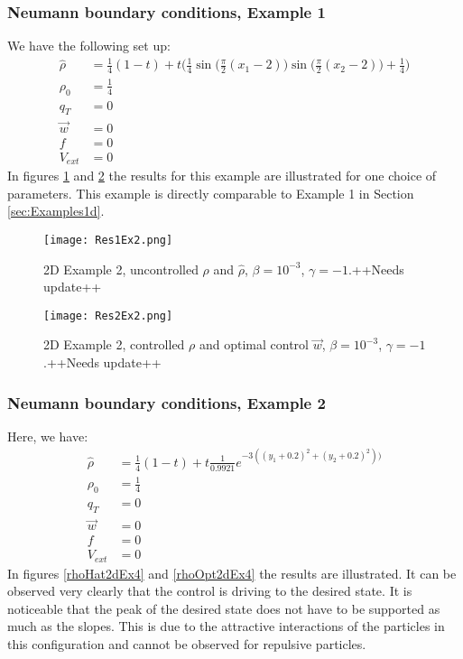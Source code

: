 \subsubsection{Neumann boundary conditions, Example 1}	
We have the following set up:
\begin{align*}
\widehat \rho &= \frac{1}{4}(1-t) + t\bigg(\frac{1}{4}\sin \bigg(\frac{\pi}{2}(x_1 - 2)\bigg)\sin \bigg(\frac{\pi}{2}(x_2 - 2)\bigg) + \frac{1}{4}\bigg)\\
\rho_0 &= \frac{1}{4}\\
q_{T} &= 0\\
\vec{w} &= 0\\
f &=0\\
V_{ext} &=0
\end{align*}
In figures \ref{rhoHat2dEx2} and \ref{rhoOpt2dEx2} the results for this example are illustrated for one choice of parameters. This example is directly comparable to Example 1 in Section \ref{sec:Examples1d}.
\begin{figure}[h]
	\texttt{[image: Res1Ex2.png]}
	\caption{2D Example 2, uncontrolled $\rho$ and $\widehat \rho$, $\beta = 10^{-3}$, $\gamma = -1$.++Needs update++}
	\label{rhoHat2dEx2}
\end{figure}
\begin{figure}[h]
	\texttt{[image: Res2Ex2.png]}
	\caption{2D Example 2, controlled $\rho$ and optimal control $\vec{w}$, $\beta = 10^{-3}$, $\gamma = -1$.++Needs update++}
	\label{rhoOpt2dEx2}
\end{figure}


\subsubsection{Neumann boundary conditions, Example 2}	
Here, we have:
\begin{align*}
\widehat \rho &= \frac{1}{4}(1-t) + t\frac{1}{0.9921}e^{-3((y_1+0.2)^2 + (y_2+0.2)^2))}\\
\rho_0 &= \frac{1}{4}\\
q_{T} &= 0\\
\vec{w} &= 0\\
f &=0\\
V_{ext} &=0
\end{align*}
In figures \ref{rhoHat2dEx4} and \ref{rhoOpt2dEx4} the results are illustrated. It can be observed very clearly that the control is driving to the desired state. It is noticeable that the peak of the desired state does not have to be supported as much as the slopes. This is due to the attractive interactions of the particles in this configuration and cannot be observed for repulsive particles.

